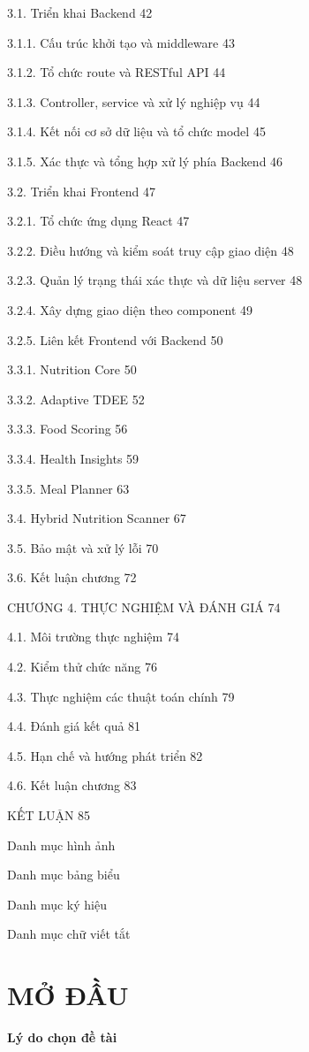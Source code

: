 3.1. Triển khai Backend	42

3.1.1. Cấu trúc khởi tạo và middleware	43

3.1.2. Tổ chức route và RESTful API	44

3.1.3. Controller, service và xử lý nghiệp vụ	44

3.1.4. Kết nối cơ sở dữ liệu và tổ chức model	45

3.1.5. Xác thực và tổng hợp xử lý phía Backend	46

3.2. Triển khai Frontend	47

3.2.1. Tổ chức ứng dụng React	47

3.2.2. Điều hướng và kiểm soát truy cập giao diện	48

3.2.3. Quản lý trạng thái xác thực và dữ liệu server	48

3.2.4. Xây dựng giao diện theo component	49

3.2.5. Liên kết Frontend với Backend	50

3.3.1. Nutrition Core	50

3.3.2. Adaptive TDEE	52

3.3.3. Food Scoring	56

3.3.4. Health Insights	59

3.3.5. Meal Planner	63

3.4. Hybrid Nutrition Scanner	67

3.5. Bảo mật và xử lý lỗi	70

3.6. Kết luận chương	72

CHƯƠNG 4. THỰC NGHIỆM VÀ ĐÁNH GIÁ	74

4.1. Môi trường thực nghiệm	74

4.2. Kiểm thử chức năng	76

4.3. Thực nghiệm các thuật toán chính	79

4.4. Đánh giá kết quả	81

4.5. Hạn chế và hướng phát triển	82

4.6. Kết luận chương	83

KẾT LUẬN	85



Danh mục hình ảnh

Danh mục bảng biểu

Danh mục ký hiệu

Danh mục chữ viết tắt


\chapter*{MỞ ĐẦU}
\textbf{Lý do chọn đề tài}

